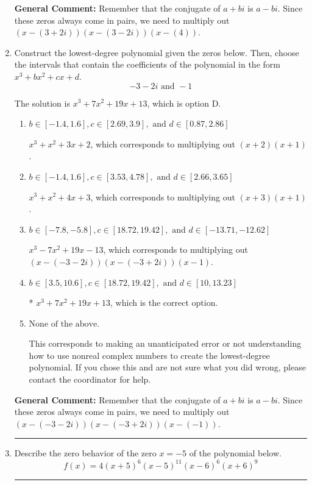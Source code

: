 \documentclass{extbook}[14pt]
\newcommand{\litem}[1]{\item #1

\rule{\textwidth}{0.4pt}}
\begin{document}
\begin{enumerate}
{\textbf{General Comment:} Remember that the conjugate of $a+bi$ is $a-bi$. Since these zeros always come in pairs, we need to multiply out $(x-(3 + 2 i))(x-(3 - 2 i))(x-(4))$.
}
\litem{
Construct the lowest-degree polynomial given the zeros below. Then, choose the intervals that contain the coefficients of the polynomial in the form $x^3+bx^2+cx+d$.
\[ -3 - 2 i \text{ and } -1 \]

The solution is \( x^{3} +7 x^{2} +19 x + 13 \), which is option D.\begin{enumerate}[label=\Alph*.]
\item \( b \in [-1.4, 1.6], c \in [2.69, 3.9], \text{ and } d \in [0.87, 2.86] \)

$x^{3} + x^{2} +3 x + 2$, which corresponds to multiplying out $(x + 2)(x + 1)$.
\item \( b \in [-1.4, 1.6], c \in [3.53, 4.78], \text{ and } d \in [2.66, 3.65] \)

$x^{3} + x^{2} +4 x + 3$, which corresponds to multiplying out $(x + 3)(x + 1)$.
\item \( b \in [-7.8, -5.8], c \in [18.72, 19.42], \text{ and } d \in [-13.71, -12.62] \)

$x^{3} -7 x^{2} +19 x -13$, which corresponds to multiplying out $(x-(-3 - 2 i))(x-(-3 + 2 i))(x -1)$.
\item \( b \in [3.5, 10.6], c \in [18.72, 19.42], \text{ and } d \in [10, 13.23] \)

* $x^{3} +7 x^{2} +19 x + 13$, which is the correct option.
\item \( \text{None of the above.} \)

This corresponds to making an unanticipated error or not understanding how to use nonreal complex numbers to create the lowest-degree polynomial. If you chose this and are not sure what you did wrong, please contact the coordinator for help.
\end{enumerate}

\textbf{General Comment:} Remember that the conjugate of $a+bi$ is $a-bi$. Since these zeros always come in pairs, we need to multiply out $(x-(-3 - 2 i))(x-(-3 + 2 i))(x-(-1))$.
}
\litem{
Describe the zero behavior of the zero $x = -5$ of the polynomial below.
\[ f(x) = 4(x + 5)^{6}(x - 5)^{11}(x - 6)^{6}(x + 6)^{9} \]

}
\end{enumerate}
\end{document}
